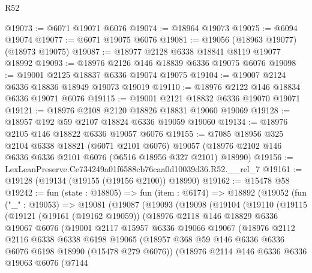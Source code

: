 \begin{lexlean}{R52}
\begin{coremodule}
@19073 := @6071 @19071 @6076
@19074 := @18964 @19073
@19075 := @6094 @19074
@19077 := @6071 @19075 @6076
@19081 := @19056 (@18963 @19077) (@18973 @19075)
@19087 := @18977 @2128 @6338 @18841 @8119 @19077 @18992
@19093 := @18976 @2126 @146 @18839 @6336 @19075 @6076
@19098 := @19001 @2125 @18837 @6336 @19074 @19075
@19104 := @19007 @2124 @6336 @18836 @18949 @19073 @19019
@19110 := @18976 @2122 @146 @18834 @6336 @19071 @6076
@19115 := @19001 @2121 @18832 @6336 @19070 @19071
@19121 := @18976 @2108 @2120 @18826 @18831 @19060 @19069
@19128 := @18957 @192 @59 @2107 @18824 @6336 @19059 @19060
@19134 := @18976 @2105 @146 @18822 @6336 @19057 @6076
@19155 := @7085
    @18956
    @325
    @2104
    @6338
    @18821
    (@6071 @2101 @6076)
    @19057
    (@18976 @2102 @146 @6336 @6336 @2101 @6076 (@6516 @18956 @327 @2101) @18990)
@19156 := LexLeanPreserve.Ce734249a01f6588cb76caa0d10039d36.R52.__rel_7
@19161 := @19128 (@19134 (@19155 (@19156 @2100)) @18990)
@19162 := @15478 @58
@19242 := fun (state : @18805) =>
  fun (item : @6174) =>
  @18892
    (@19052
      (fun ("_" : @19053) =>
      @19081
        (@19087
          (@19093
            (@19098
              (@19104
                (@19110
                  (@19115
                    (@19121
                      (@19161 (@19162 @19059))
                      (@18976
                        @2118
                        @146
                        @18829
                        @6336
                        @19067
                        @6076
                        (@19001
                          @2117
                          @15957
                          @6336
                          @19066
                          @19067
                          (@18976
                            @2112
                            @2116
                            @6338
                            @6338
                            @6198
                            @19065
                            (@18957
                              @368
                              @59
                              @146
                              @6336
                              @6336
                              @6076
                              @6198
                              @18990
                              (@15478 @279 @6076))
                            (@18976
                              @2114
                              @146
                              @6336
                              @6336
                              @19063
                              @6076
                              (@7144

\end{coremodule}
\end{lexlean}
